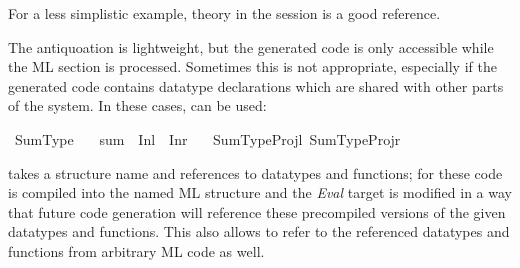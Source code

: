 \begin{isabellebody}
\begin{isamarkuptext}
  For a less simplistic example, theory  in
  the  session is a good reference.%
\end{isamarkuptext}%
\isamarkuptrue%
%
\isamarkuptrue%
%
\begin{isamarkuptext}%
The  antiquoation is lightweight, but the generated code
  is only accessible while the ML section is processed.  Sometimes this
  is not appropriate, especially if the generated code contains datatype
  declarations which are shared with other parts of the system.  In these
  cases, \hypertarget{command.code-reflect}{\hyperlink{command.code-reflect}{\mbox{}}} can be used:%
\end{isamarkuptext}%
\isamarkuptrue%
%
\isadelimquote
%
\endisadelimquote
%
\isatagquote
{}\isamarkupfalse%
\ Sum{}Type\isanewline
\ \ \ sum\ {}\ Inl\ {}\ Inr\isanewline
\ \ \ {}Sum{}Type{}Projl{}\ {}Sum{}Type{}Projr{}%
\endisatagquote
{\isafoldquote}%
%
\isadelimquote
%
\endisadelimquote
%
\begin{isamarkuptext}%
\noindent {}\hypertarget{command.code-reflect}{\hyperlink{command.code-reflect}{\mbox{}}} takes a structure name and
  references to datatypes and functions; for these code is compiled
  into the named ML structure and the \emph{Eval} target is modified
  in a way that future code generation will reference these
  precompiled versions of the given datatypes and functions.  This
  also allows to refer to the referenced datatypes and functions from
  arbitrary ML code as well.


\end{isamarkuptext}
\end{isabellebody}
